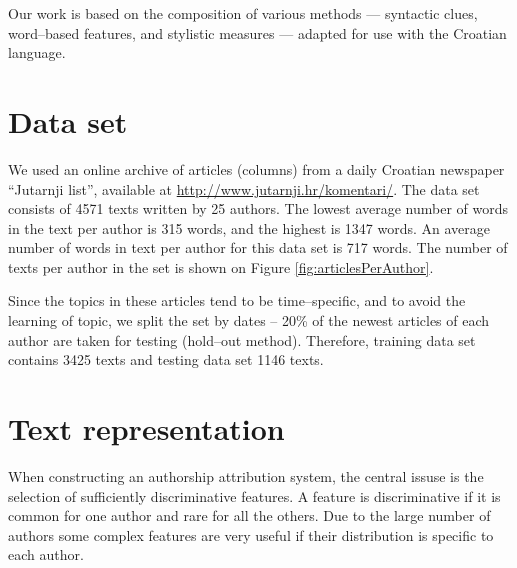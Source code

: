\documentclass[11pt,english]{article}
\begin{document}
\begin{multicols}{2}
Our work is based on the composition of various methods --- syntactic clues, word--based features, 
and stylistic measures --- adapted for use with the Croatian language. 

\section{Data set}
\label{sec:podatci}
We used an online archive of articles (columns) from a daily Croatian newspaper ``Jutarnji
list'', available at \url{http://www.jutarnji.hr/komentari/}. The data set
consists of 4571 texts written by 25 authors. The lowest average number of words
in the text per author is 315 words, and the highest is 1347 words. An average number
of words in text per author for this data set is 717 words. The number of texts per
author in the set is shown on Figure \ref{fig:articlesPerAuthor}.

Since the topics in these articles tend to be time--specific, and to avoid the learning of topic, 
we split the set by dates -- 20\% of the newest articles of
each author are taken for testing (hold--out method). Therefore, training data
set contains 3425 texts and testing data set 1146 texts.

\begin{minipage}{0.8\linewidth}
\vspace{10pt}
\centerline{\resizebox{1.4\linewidth}{!}{}}%
%
\label{fig:articlesPerAuthor}
\end{minipage}

\section{Text representation}
When constructing an authorship attribution system, the central issuse is the selection of 
sufficiently discriminative features. A feature is discriminative if it is common for one author 
and rare for all the others. Due to the large number of authors some complex features are very useful if their
distribution is specific to each author. %



\end{multicols}
\end{document}
